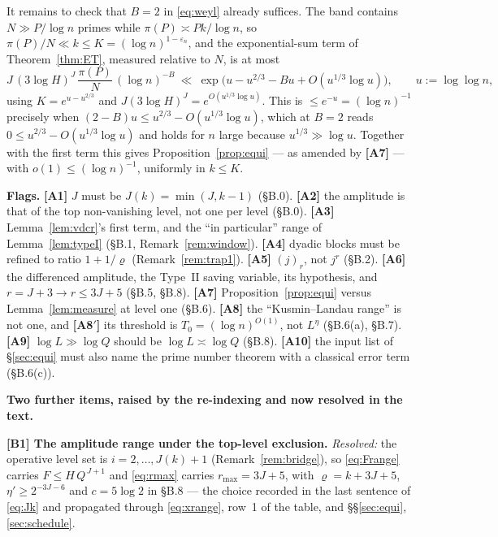 \documentclass[11pt]{article}
\theoremstyle{definition}
\theoremstyle{plain}
\begin{document}
It remains to check that $B=2$ in \eqref{eq:weyl} already suffices.  The
band contains $N\gg P/\log n$ primes while $\pi(P)\asymp Pk/\log n$, so
$\pi(P)/N\ll k\le K=(\log n)^{1-\varepsilon_{n}}$, and the
exponential-sum term of Theorem~\ref{thm:ET}, measured relative to $N$,
is at most
\[
J\,(3\log H)^{J}\,\frac{\pi(P)}{N}\,(\log n)^{-B}
\ \ll\ \exp\bigl(u-u^{2/3}-Bu+O(u^{1/3}\log u)\bigr),
\qquad u:=\log\log n,
\]
using $K=e^{u-u^{2/3}}$ and $J(3\log H)^{J}=e^{O(u^{1/3}\log u)}$.  This
is $\le e^{-u}=(\log n)^{-1}$ precisely when
$(2-B)u\le u^{2/3}-O(u^{1/3}\log u)$, which at $B=2$ reads
$0\le u^{2/3}-O(u^{1/3}\log u)$ and holds for $n$ large because
$u^{1/3}\gg\log u$.  Together with the first term this gives
Proposition~\ref{prop:equi} --- as amended by \textbf{[A7]} --- with
$o(1)\le(\log n)^{-1}$, uniformly in $k\le K$.

\medskip
\noindent\textbf{Flags.}
\textbf{[A1]} $J$ must be $J(k)=\min(J,k-1)$ (\S B.0).
\textbf{[A2]} the amplitude is that of the top non-vanishing level, not
one per level (\S B.0).
\textbf{[A3]} Lemma~\ref{lem:vdcr}'s first term, and the ``in
particular'' range of Lemma~\ref{lem:typeI} (\S B.1,
Remark~\ref{rem:window}).
\textbf{[A4]} dyadic blocks must be refined to ratio $1+1/\varrho$
(Remark~\ref{rem:trap1}).
\textbf{[A5]} $(j)_{r}$, not $j^{r}$ (\S B.2).
\textbf{[A6]} the differenced amplitude, the Type~II saving variable, its
hypothesis, and $r=J+3\to r\le3J+5$ (\S B.5, \S B.8).
\textbf{[A7]} Proposition~\ref{prop:equi} versus
Lemma~\ref{lem:measure} at level one (\S B.6).
\textbf{[A8]} the ``Kusmin--Landau range'' is not one, and
\textbf{[A8$'$]} its threshold is $T_{0}=(\log n)^{O(1)}$, not $L^{\eta}$
(\S B.6(a), \S B.7).
\textbf{[A9]} $\log L\gg\log Q$ should be $\log L\asymp\log Q$ (\S B.8).
\textbf{[A10]} the input list of \S\ref{sec:equi} must also name the
prime number theorem with a classical error term (\S B.6(c)).

\medskip
\noindent\textbf{Two further items, raised by the re-indexing and now
resolved in the text.}

\textbf{[B1] The amplitude range under the top-level exclusion.}
\emph{Resolved:} the operative level set is $i=2,\dots,J(k)+1$
(Remark~\ref{rem:bridge}), so \eqref{eq:Frange} carries
$F\le H\,Q^{\,J+1}$ and \eqref{eq:rmax} carries $r_{\max}=3J+5$, with
$\varrho=k+3J+5$, $\eta'\ge2^{-3J-6}$ and $c=5\log2$ in \S B.8 --- the
choice recorded in the last sentence of \eqref{eq:Jk} and propagated
through \eqref{eq:xrange}, row~1 of the table, and \S\S\ref{sec:equi},
\ref{sec:schedule}.
\end{document}
